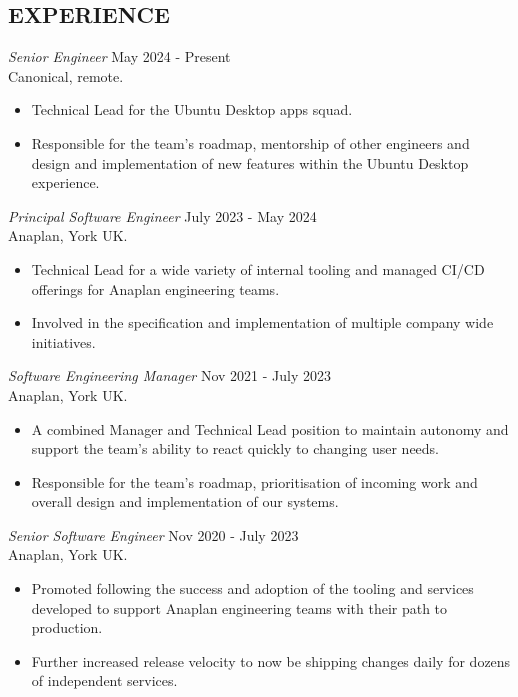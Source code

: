 \documentclass[margin]{res}
\begin{document}
\begin{resume}
\section{EXPERIENCE}
{\sl Senior Engineer} \hfill May 2024 - Present \\
Canonical, remote.
\begin{itemize}  \itemsep -2pt %
  \item Technical Lead for the Ubuntu Desktop apps squad.
  \item Responsible for the team's roadmap, mentorship of other engineers and design
        and implementation of new features within the Ubuntu Desktop experience.
\end{itemize}

{\sl Principal Software Engineer} \hfill July 2023 - May 2024 \\
Anaplan, York UK.
\begin{itemize}  \itemsep -2pt %
  \item Technical Lead for a wide variety of internal tooling and managed
        CI/CD offerings for Anaplan engineering teams.
  \item Involved in the specification and implementation of multiple
        company wide initiatives.
\end{itemize}

{\sl Software Engineering Manager} \hfill Nov 2021 - July 2023  \\
Anaplan, York UK.
\begin{itemize}  \itemsep -2pt %
  \item A combined Manager and Technical Lead position to
        maintain autonomy and support the team's ability to react
        quickly to changing user needs.
  \item Responsible for the team's roadmap, prioritisation of incoming
        work and overall design and implementation of our systems.
\end{itemize}

{\sl Senior Software Engineer} \hfill Nov 2020 - July 2023  \\
Anaplan, York UK.
\begin{itemize}  \itemsep -2pt %
  \item Promoted following the success and adoption of the tooling and
        services developed to support Anaplan engineering teams with
        their path to production.
  \item Further increased release velocity to now be shipping changes
        daily for dozens of independent services.
\end{itemize}


\end{resume}
\end{document}
